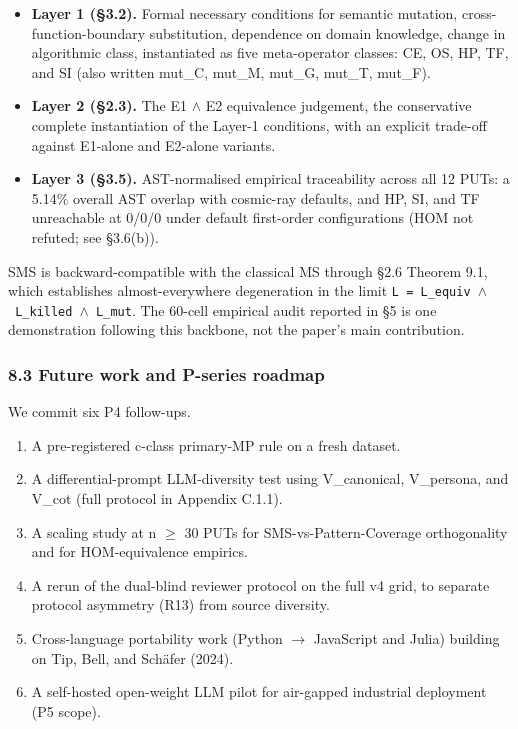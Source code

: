 \documentclass[review,12pt,authoryear]{elsarticle}
\providecommand{\tightlist}{\setlength{\itemsep}{0pt}\setlength{\parskip}{0pt}}
\begin{document}
\begin{itemize}
\tightlist
\item
  \textbf{Layer 1 (§3.2).} Formal necessary conditions for semantic
  mutation, cross-function-boundary substitution, dependence on domain
  knowledge, change in algorithmic class, instantiated as five
  meta-operator classes: CE, OS, HP, TF, and SI (also written mut\_C,
  mut\_M, mut\_G, mut\_T, mut\_F).
\item
  \textbf{Layer 2 (§2.3).} The E1 $\wedge$ E2 equivalence judgement, the
  conservative complete instantiation of the Layer-1 conditions, with an
  explicit trade-off against E1-alone and E2-alone variants.
\item
  \textbf{Layer 3 (§3.5).} AST-normalised empirical traceability across
  all 12 PUTs: a 5.14\% overall AST overlap with cosmic-ray defaults,
  and HP, SI, and TF unreachable at 0/0/0 under default first-order
  configurations (HOM not refuted; see §3.6(b)).
\end{itemize}

SMS is backward-compatible with the classical MS through §2.6 Theorem
9.1, which establishes almost-everywhere degeneration in the limit
\texttt{L\ =\ L\_equiv\ $\wedge$\ L\_killed\ $\wedge$\ L\_mut}. The 60-cell empirical
audit reported in §5 is one demonstration following this backbone, not
the paper's main contribution.

\subsubsection{8.3 Future work and P-series roadmap}\label{future-work-and-p-series-roadmap}

We commit six P4 follow-ups.

\begin{enumerate}
\def\labelenumi{(\alph{enumi})}
\item
  A pre-registered c-class primary-MP rule on a fresh dataset.
\item
  A differential-prompt LLM-diversity test using V\_canonical,
  V\_persona, and V\_cot (full protocol in Appendix C.1.1).
\item
  A scaling study at n $\geq$ 30 PUTs for SMS-vs-Pattern-Coverage
  orthogonality and for HOM-equivalence empirics.
\item
  A rerun of the dual-blind reviewer protocol on the full v4 grid, to
  separate protocol asymmetry (R13) from source diversity.
\item
  Cross-language portability work (Python $\to$ JavaScript and Julia)
  building on Tip, Bell, and Schäfer (2024).
\item
  A self-hosted open-weight LLM pilot for air-gapped industrial
  deployment (P5 scope).
\end{enumerate}
\end{document}
